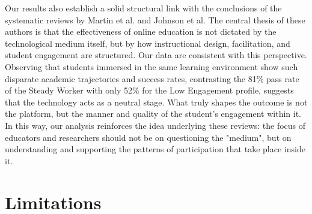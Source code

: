 Our results also establish a solid structural link with the conclusions of the systematic reviews by Martin et al. and Johnson et al. The central thesis of these authors is that the effectiveness of online education is not dictated by the technological medium itself, but by how instructional design, facilitation, and student engagement are structured. Our data are consistent with this perspective. Observing that students immersed in the same learning environment show such disparate academic trajectories and success rates, contrasting the 81\% pass rate of the Steady Worker with only 52\% for the Low Engagement profile, suggests that the technology acts as a neutral stage. What truly shapes the outcome is not the platform, but the manner and quality of the student's engagement within it. In this way, our analysis reinforces the idea underlying these reviews: the focus of educators and researchers should not be on questioning the "medium", but on understanding and supporting the patterns of participation that take place inside it.

\section{Limitations}
\label{sec:limitations}
%
%
%
%
%

